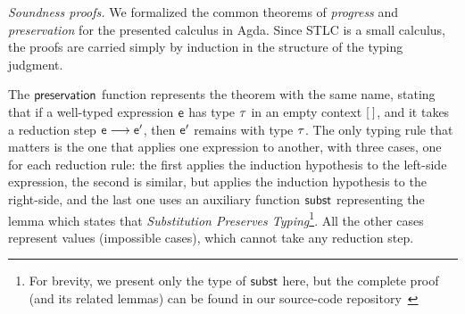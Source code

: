 \documentclass[tese,capa,english]{texufpel}
\newcommand{\D}[1]{\blue{\mathsf{#1}}}
\newcommand{\Con}[1]{\green{\mathsf{#1}}}
\newcommand{\F}[1]{\blue{\mathsf{#1}}}
\newcommand{\V}[1]{\black{\mathsf{#1}}}
\begin{document}
\vspace{8pt}
\noindent\emph{Soundness proofs.} We formalized the common theorems of \emph{progress} and \emph{preservation} for the presented calculus in Agda. Since STLC is a small calculus, the proofs are carried simply by induction in the structure of the typing judgment.

The \ensuremath{\F{preservation}} function represents the theorem with the same name, stating that if a well-typed expression \ensuremath{\V{e}} has type \ensuremath{\V{\tau}} in an empty context \ensuremath{\Con{\lbrack\:\rbrack}}, and it takes a reduction step \ensuremath{\V{e}\;\D{\longrightarrow}\;\V{e'}}, then \ensuremath{\V{e'}} remains with type \ensuremath{\V{\tau}}. The only typing rule that matters is the one that applies one expression to another, with three cases, one for each reduction rule: the first applies the induction hypothesis to the left-side expression, the second is similar, but applies the induction hypothesis to the right-side, and the last one uses an auxiliary function \ensuremath{\D{subst}} representing the lemma which states that \emph{Substitution Preserves Typing}\footnote{For brevity, we present only the type of \ensuremath{\D{subst}} here, but the complete proof (and its related lemmas) can be found in our source-code repository~\cite{repos}}. All the other cases represent values (impossible cases), which cannot take any reduction step.
\end{document}
